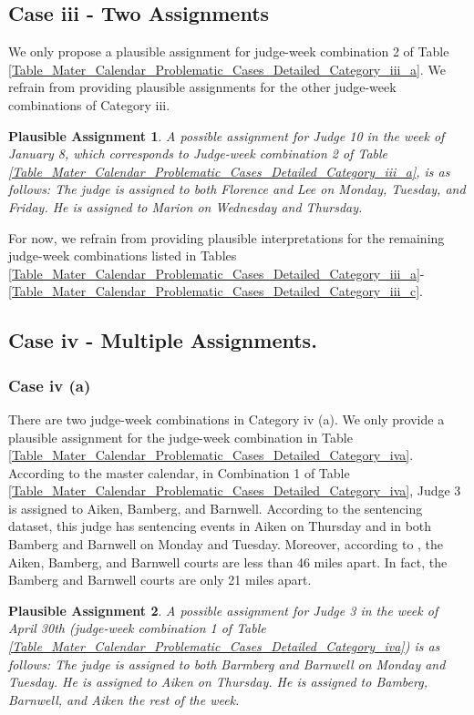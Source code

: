 \documentclass[11pt, oneside]{article}   	%
\theoremstyle{ModifiedStyle}
\newtheorem{plausible_assignment}{Plausible Assignment}
\begin{document}
\subsection{Case iii - Two Assignments}
%
We only propose a plausible assignment for judge-week combination 2 of Table \ref{Table_Mater_Calendar_Problematic_Cases_Detailed_Category_iii_a}. We refrain from providing plausible assignments for the other judge-week combinations of Category iii.
%
\begin{plausible_assignment}
	A possible assignment for Judge 10 in the week of January 8, which corresponds to Judge-week combination 2 of Table \ref{Table_Mater_Calendar_Problematic_Cases_Detailed_Category_iii_a}, is as follows: The judge is assigned to both Florence and Lee on Monday, Tuesday, and Friday. He is assigned to Marion on Wednesday and Thursday.
\end{plausible_assignment}
For now, we refrain from providing plausible interpretations for the remaining judge-week combinations listed in Tables \ref{Table_Mater_Calendar_Problematic_Cases_Detailed_Category_iii_a}-\ref{Table_Mater_Calendar_Problematic_Cases_Detailed_Category_iii_c}.
%
\subsection{Case iv - Multiple Assignments.}
%
\subsubsection{Case iv (a)}
%
There are two judge-week combinations in Category iv (a). We only provide a plausible assignment for the judge-week combination in Table \ref{Table_Mater_Calendar_Problematic_Cases_Detailed_Category_iva}. According to the master calendar, in Combination 1 of Table \ref{Table_Mater_Calendar_Problematic_Cases_Detailed_Category_iva}, Judge 3 is assigned to Aiken, Bamberg, and Barnwell. According to the sentencing dataset, this judge has sentencing events in Aiken on Thursday and in both Bamberg and Barnwell on Monday and Tuesday. Moreover, according to \citet{SCCourts}, the Aiken, Bamberg, and Barnwell courts are less than 46 miles apart. In fact, the Bamberg and Barnwell courts are only 21 miles apart. 
%
\begin{plausible_assignment}
	A possible assignment for Judge 3 in the week of April 30th (judge-week combination 1 of Table \ref{Table_Mater_Calendar_Problematic_Cases_Detailed_Category_iva}) is as follows: The judge is assigned to both Barmberg and Barnwell on Monday and Tuesday. He is assigned to Aiken on Thursday. He is assigned to Bamberg, Barnwell, and Aiken the rest of the week.
\end{plausible_assignment}
%
\end{document}
